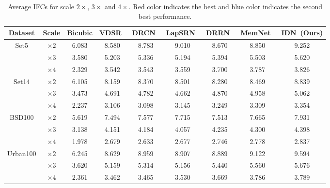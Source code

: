 \documentclass[10pt,twocolumn,letterpaper]{article}
\begin{document}
\begin{table*}[htb]
	\small
	\centering
	\begin{tabular}{|c|c|c|c|c|c|c|c||c|}
		\hline
		Dataset & Scale & Bicubic & VDSR~\cite{VDSR} & DRCN~\cite{DRCN} & LapSRN~\cite{LapSRN} & DRRN~\cite{DRRN} & MemNet~\cite{MemNet} & IDN~(Ours) \\
		\hline
		\hline
		\multirow{3}{*}{Set5} & $\times 2$ & 6.083 & 8.580 & 8.783 & \textcolor[rgb]{0.00,0.07,1.00}{9.010} & 8.670 & 8.850 & \textcolor[rgb]{1.00,0.00,0.00}{9.252} \\
		& $\times 3$ & 3.580 & 5.203 & 5.336 & 5.194 & 5.394 & \textcolor[rgb]{0.00,0.07,1.00}{5.503} & \textcolor[rgb]{1.00,0.00,0.00}{5.620} \\
		& $\times 4$ & 2.329 & 3.542 & 3.543 & 3.559 & 3.700 & \textcolor[rgb]{0.00,0.07,1.00}{3.787} & \textcolor[rgb]{1.00,0.00,0.00}{3.826} \\
		\hline
		\hline
		\multirow{3}{*}{Set14} & $\times 2$ & 6.105 & 8.159 & 8.370 & \textcolor[rgb]{0.00,0.07,1.00}{8.501} & 8.280 & 8.469 & \textcolor[rgb]{1.00,0.00,0.00}{8.839} \\
		& $\times 3$ & 3.473 & 4.691 & 4.782 & 4.662 & 4.870 & \textcolor[rgb]{0.00,0.07,1.00}{4.958} & \textcolor[rgb]{1.00,0.00,0.00}{5.062} \\
		& $\times 4$ & 2.237 & 3.106 & 3.098 & 3.145 & 3.249 & \textcolor[rgb]{0.00,0.07,1.00}{3.309} & \textcolor[rgb]{1.00,0.00,0.00}{3.354} \\
		\hline
		\hline
		
		\multirow{3}{*}{BSD100} & $\times 2$ & 5.619 & 7.494 & 7.577 & \textcolor[rgb]{0.00,0.07,1.00}{7.715} & 7.513 & 7.665 & \textcolor[rgb]{1.00,0.00,0.00}{7.931} \\
		& $\times 3$ & 3.138 & 4.151 & 4.184 & 4.057 & 4.235 & \textcolor[rgb]{0.00,0.07,1.00}{4.300} & \textcolor[rgb]{1.00,0.00,0.00}{4.398} \\
		& $\times 4$ & 1.978 & 2.679 & 2.633 & 2.677 & 2.746 & \textcolor[rgb]{0.00,0.07,1.00}{2.778} & \textcolor[rgb]{1.00,0.00,0.00}{2.837} \\
		\hline
		\hline
		
		\multirow{3}{*}{Urban100} & $\times 2$ & 6.245 & 8.629 & 8.959 & 8.907 & 8.889 & \textcolor[rgb]{0.00,0.07,1.00}{9.122} & \textcolor[rgb]{1.00,0.00,0.00}{9.594} \\
		& $\times 3$ & 3.620 & 5.159 & 5.314 & 5.156 & 5.440 & \textcolor[rgb]{0.00,0.07,1.00}{5.560} & \textcolor[rgb]{1.00,0.00,0.00}{5.676} \\
		& $\times 4$ & 2.361 & 3.462 & 3.465 & 3.530 & 3.669 & \textcolor[rgb]{0.00,0.07,1.00}{3.786} & \textcolor[rgb]{1.00,0.00,0.00}{3.789} \\
		\hline
	\end{tabular}
	\caption{Average IFCs for scale $2 \times$, $3 \times$ and $4 \times$. Red color indicates the best and blue color indicates the second best performance.}
	\label{tab:ifc}
\end{table*}
\end{document}
